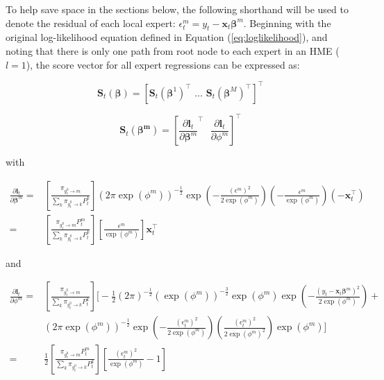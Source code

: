 \documentclass[12pt]{article}
\newcommand{\gateprod}[2]{\pi_{#1 \longrightarrow #2}}
\theoremstyle{definition}
\begin{document}
To help save space in the sections below, the following shorthand will be used 
to denote the residual of each local expert: $\epsilon^{m}_{t} = y_{t} - \boldsymbol{x}_{t} \boldsymbol{\beta}^{m}$.
Beginning with the original log-likelihood equation defined in Equation (\ref{eq:loglikelihood}),
and noting that there is only one path from root node to each expert in an HME ($l = 1$),
the score vector for all expert regressions can be expressed as:

\begin{equation}
  \boldsymbol{S}_{t}(\boldsymbol{\beta}) = [ \boldsymbol{S}_{t}(\boldsymbol{\beta}^{1})^{\top} \,\, \ldots \,\, \boldsymbol{S}_{t}(\boldsymbol{\beta}^{M})^{\top} ]^{\top}
\end{equation}

\begin{equation} \label{eq:expertScore}
  \boldsymbol{S}_{t}(\boldsymbol{\beta^{m}}) = \left[ \frac{\partial \boldsymbol{l}_{t}}{\partial \boldsymbol{\beta}^{m}}^{\top} \,\,\,\, \frac{\partial \boldsymbol{l}_{t}}{\partial \phi^{m}} \right]^{\top}
\end{equation}

with

\begin{align} \label{eq:ExpertScoreBeta}
  \frac{\partial \boldsymbol{l}_{t}}{\partial \boldsymbol{\beta}^{m}} =& \left[ \frac{\gateprod{g^{0}_{t}}{m}}{ \sum_{k} \gateprod{g^{0}_{t}}{k} P^{k}_{t}} \right] \left( 2 \pi \exp ( \phi^{m} ) \right)^{-\frac{1}{2}} \exp{ \left( -\frac{  (\epsilon^{m})^{2}  }{2 \exp (\phi^{m}) } \right) } \left( - \frac{\epsilon^{m}}{\exp(\phi^{m})} \right) (-\boldsymbol{x}_{t}^{\top}) \nonumber \\
   =& \left[ \frac{\gateprod{g^{0}_{t}}{m} P^{m}_{t}}{ \sum_{k} \gateprod{g^{0}_{t}}{k} P^{k}_{t}} \right] \left[ \frac{\epsilon^{m}}{\exp(\phi^{m})} \right] \boldsymbol{x}_{t}^{\top}
\end{align}

and

\begin{align} \label{eq:ExpertScoreVariance}
  \frac{\partial \boldsymbol{l}_{t}}{\partial \phi^{m}} =& \left[ \frac{ \gateprod{g^{0}_{t}}{m} }{ \sum_{k} \gateprod{g^{0}_{t}}{k} P^{k}_{t}} \right] \bigg[ -\frac{1}{2} (2 \pi)^{-\frac{1}{2}} \left( \exp ( \phi^{m} ) \right)^{-\frac{3}{2}} \exp ( \phi^{m} ) \exp{ \left( -\frac{  ( y_{t} - \boldsymbol{x}_{t} \boldsymbol{\beta}^{m} )^{2}  }{2 \exp (\phi^{m}) } \right) }   + \nonumber \\
   & \left( 2 \pi \exp ( \phi^{m} ) \right)^{-\frac{1}{2}} \exp{ \left( -\frac{  (\epsilon^{m}_{t})^{2}  }{2 \exp (\phi^{m}) } \right) } \left( \frac{ ( \epsilon^{m}_{t} )^{2} }{ 2 \exp( \phi^{m} )^{2} } \right) \exp( \phi^{m} ) \bigg] \nonumber \\
   =& \frac{1}{2} \left[ \frac{ \gateprod{g^{0}_{t}}{m} P^{m}_{t} }{ \sum_{k} \gateprod{g^{0}_{t}}{k} P^{k}_{t}} \right] \left[ \frac{ (\epsilon^{m}_{t})^{2} }{ \exp( \phi^{m} )} - 1 \right]
\end{align}
\end{document}

